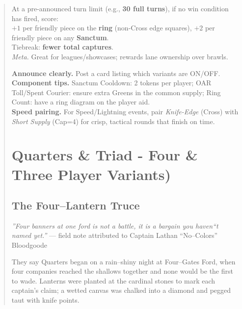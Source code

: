 \documentclass[11pt]{article}
\begin{document}
\begin{quote}
\begin{rulevariant}[title={Ring Count (Timed Scoring Ending)}]
At a pre-announced turn limit (e.g., \textbf{30 full turns}), if no win condition has fired, score:\\
\quad\(+1\) per friendly piece on the \textbf{ring} (non-Cross edge squares), \quad \(+2\) per friendly piece on any \textbf{Sanctum}.\\
Tiebreak: \textbf{fewer total captures}.\\
\textit{Meta.} Great for leagues/showcases; rewards lane ownership over brawls.
\end{rulevariant}

\medskip
\begin{tcolorbox}[enhanced,breakable,colback=white,colframe=royal,boxrule=0.8pt,title={Director's Notes}]
\small
\textbf{Announce clearly.} Post a card listing which variants are ON/OFF. \\
\textbf{Component tips.} Sanctum Cooldown: 2 tokens per player; OAR Toll/Spent Courier: ensure extra Greens in the common supply; Ring Count: have a ring diagram on the player aid. \\
\textbf{Speed pairing.} For Speed/Lightning events, pair \emph{Knife-Edge} (Cross) with \emph{Short Supply} (Cap=4) for crisp, tactical rounds that finish on time.
\end{tcolorbox}

\clearpage

\section{Quarters \& Triad - Four \& Three Player Variants)}
\label{sec:quarters}

\subsection*{The Four--Lantern Truce}
\begin{tcolorbox}[enhanced,breakable,
  colback=royal!3, colframe=royal!70!black, boxrule=0.6pt,
  left=6pt, right=6pt, top=6pt, bottom=6pt]
\small
\textit{''Four banners at one ford is not a battle, it is a bargain you haven``t named yet.''} --- field note attributed to Captain Lathan ``No--Colors'' Bloodgoode

\medskip
They say Quarters began on a rain--shiny night at Four--Gates Ford, when four companies reached the shallows together and none would be the first to wade. Lanterns were planted at the cardinal stones to mark each captain's claim; a wetted canvas was chalked into a diamond and pegged taut with knife points. 


\end{tcolorbox}
\end{quote}
\end{document}

